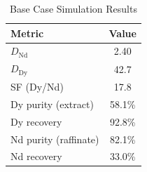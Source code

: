 \begin{table}[htbp]
\centering
\caption{Base Case Simulation Results}
\label{tab:base-results}
\begin{tabular}{lc}
\toprule
Metric & Value \\
\midrule
$D_{\text{Nd}}$ & 2.40 \\
$D_{\text{Dy}}$ & 42.7 \\
SF (Dy/Nd) & 17.8 \\
Dy purity (extract) & 58.1\% \\
Dy recovery & 92.8\% \\
Nd purity (raffinate) & 82.1\% \\
Nd recovery & 33.0\% \\
\bottomrule
\end{tabular}
\end{table}